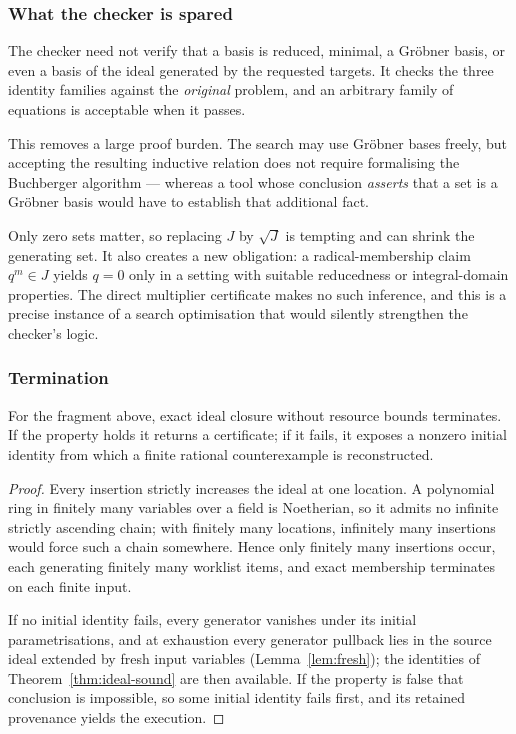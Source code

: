 \subsubsection*{What the checker is spared}

The checker need not verify that a basis is reduced, minimal, a Gr\"obner
basis, or even a basis of the ideal generated by the requested targets. It
checks the three identity families against the \emph{original} problem, and an
arbitrary family of equations is acceptable when it passes.

This removes a large proof burden. The search may use Gr\"obner bases freely,
but accepting the resulting inductive relation does not require formalising the
Buchberger algorithm --- whereas a tool whose conclusion \emph{asserts} that a
set is a Gr\"obner basis would have to establish that additional fact.

\begin{remark}
Only zero sets matter, so replacing $J$ by $\sqrt J$ is tempting and can shrink
the generating set. It also creates a new obligation: a radical-membership
claim $q^m\in J$ yields $q=0$ only in a setting with suitable reducedness or
integral-domain properties. The direct multiplier certificate makes no such
inference, and this is a precise instance of a search optimisation that would
silently strengthen the checker's logic.
\end{remark}

\subsubsection*{Termination}

\begin{theorem}
\label{thm:ideal-terminates}
For the fragment above, exact ideal closure without resource bounds terminates.
If the property holds it returns a certificate; if it fails, it exposes a
nonzero initial identity from which a finite rational counterexample is
reconstructed.
\end{theorem}
\begin{proof}
Every insertion strictly increases the ideal at one location. A polynomial ring
in finitely many variables over a field is Noetherian, so it admits no infinite
strictly ascending chain; with finitely many locations, infinitely many
insertions would force such a chain somewhere. Hence only finitely many
insertions occur, each generating finitely many worklist items, and exact
membership terminates on each finite input.

If no initial identity fails, every generator vanishes under its initial
parametrisations, and at exhaustion every generator pullback lies in the source
ideal extended by fresh input variables (Lemma~\ref{lem:fresh}); the identities
of Theorem~\ref{thm:ideal-sound} are then available. If the property is false
that conclusion is impossible, so some initial identity fails first, and its
retained provenance yields the execution.
\end{proof}

